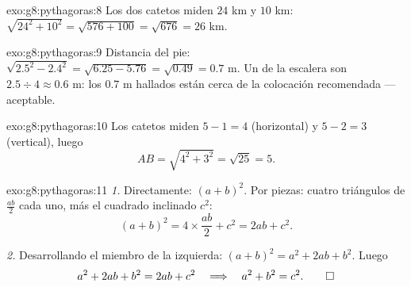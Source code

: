 \begin{solution}{exo:g8:pythagoras:8}
Los dos catetos miden $24$ km y $10$ km:
$\sqrt{24^2 + 10^2} = \sqrt{576 + 100} = \sqrt{676} = 26$ km.
\end{solution}

\begin{solution}{exo:g8:pythagoras:9}
Distancia del pie: $\sqrt{2.5^2 - 2.4^2} = \sqrt{6.25 - 5.76} =
\sqrt{0.49} = 0.7$ m. Un  de la escalera son
$2.5 \div 4 \approx 0.6$ m: los $0.7$ m hallados están cerca de la colocación
recomendada --- aceptable.
\end{solution}

\begin{solution}{exo:g8:pythagoras:10}
Los catetos miden $5 - 1 = 4$ (horizontal) y $5 - 2 = 3$
(vertical), luego
\[
AB = \sqrt{4^2 + 3^2} = \sqrt{25} = 5 .
\]
\end{solution}

\begin{solution}{exo:g8:pythagoras:11}
\emph{1.} Directamente: $(a + b)^2$. Por piezas: cuatro triángulos de 
$\frac{ab}{2}$ cada uno, más el cuadrado inclinado $c^2$:
\[
(a + b)^2 = 4 \times \frac{ab}{2} + c^2 = 2ab + c^2 .
\]

\emph{2.} Desarrollando el miembro de la izquierda:
$(a+b)^2 = a^2 + 2ab + b^2$. Luego
\[
a^2 + 2ab + b^2 = 2ab + c^2
\quad\Longrightarrow\quad
a^2 + b^2 = c^2 . \qed
\]
\end{solution}

